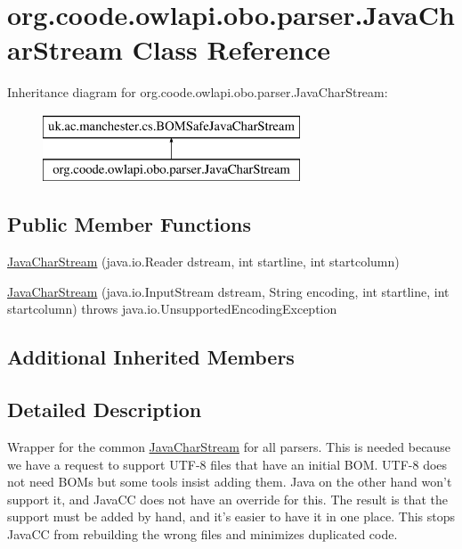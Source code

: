 \hypertarget{classorg_1_1coode_1_1owlapi_1_1obo_1_1parser_1_1_java_char_stream}{\section{org.\-coode.\-owlapi.\-obo.\-parser.\-Java\-Char\-Stream Class Reference}
\label{classorg_1_1coode_1_1owlapi_1_1obo_1_1parser_1_1_java_char_stream}
}
Inheritance diagram for org.\-coode.\-owlapi.\-obo.\-parser.\-Java\-Char\-Stream\-:\begin{figure}[H]
\begin{center}
\leavevmode
\includegraphics[height=2.000000cm]{classorg_1_1coode_1_1owlapi_1_1obo_1_1parser_1_1_java_char_stream}
\end{center}
\end{figure}
\subsection*{Public Member Functions}
\begin{DoxyCompactItemize}
\item 
\hyperlink{classorg_1_1coode_1_1owlapi_1_1obo_1_1parser_1_1_java_char_stream_affc36776e9ec79bcad2b24535f2ed79a}{Java\-Char\-Stream} (java.\-io.\-Reader dstream, int startline, int startcolumn)
\item 
\hyperlink{classorg_1_1coode_1_1owlapi_1_1obo_1_1parser_1_1_java_char_stream_a957861d093680b2c422d47eda7b82b8c}{Java\-Char\-Stream} (java.\-io.\-Input\-Stream dstream, String encoding, int startline, int startcolumn)  throws java.\-io.\-Unsupported\-Encoding\-Exception 
\end{DoxyCompactItemize}
\subsection*{Additional Inherited Members}


\subsection{Detailed Description}
Wrapper for the common \hyperlink{classorg_1_1coode_1_1owlapi_1_1obo_1_1parser_1_1_java_char_stream}{Java\-Char\-Stream} for all parsers. This is needed because we have a request to support U\-T\-F-\/8 files that have an initial B\-O\-M. U\-T\-F-\/8 does not need B\-O\-Ms but some tools insist adding them. Java on the other hand won't support it, and Java\-C\-C does not have an override for this. The result is that the support must be added by hand, and it's easier to have it in one place. This stops Java\-C\-C from rebuilding the wrong files and minimizes duplicated code. 


